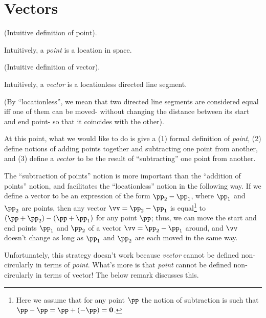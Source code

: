 \section{Vectors}

\begin{defn}
    (Intuitive definition of point).
    
    Intuitively, a \textit{point} is a location in space.
\end{defn}

\begin{defn}
    (Intuitive definition of vector).
    
    Intuitively, a \textit{vector} is a locationless directed line segment. 
    
    (By ``locationless'', we mean that two directed line segments are considered equal iff one of them can be moved- without changing the distance between its start and end point- so that it coincides with the other).
\end{defn}

At this point, what we would like to do is give a (1) formal definition of \textit{point}, (2) define notions of adding points together and subtracting one point from another, and (3) define a \textit{vector} to be the result of ``subtracting'' one point from another. 

The ``subtraction of points'' notion is more important than the ``addition of points'' notion, and facilitates the ``locationless'' notion in the following way. If we define a vector to be an expression of the form $\pp_2 - \pp_1$, where $\pp_1$ and $\pp_2$ are points, then any vector $\vv = \pp_2 - \pp_1$ is equal\footnote{Here we assume that for any point $\pp$ the notion of subtraction is such that $\pp - \pp = \pp + (-\pp) = \mathbf{0}$.} to $(\pp + \pp_2) - (\pp + \pp_1)$ for any point $\pp$; thus, we can move the start and end points $\pp_1$ and $\pp_2$ of a vector $\vv = \pp_2 - \pp_1$ around, and $\vv$ doesn't change as long as $\pp_1$ and $\pp_2$ are each moved in the same way.

Unfortunately, this strategy doesn't work because \textit{vector} cannot be defined non-circularly in terms of \textit{point}. What's more is that \textit{point} cannot be defined non-circularly in terms of vector! The below remark discusses this.

